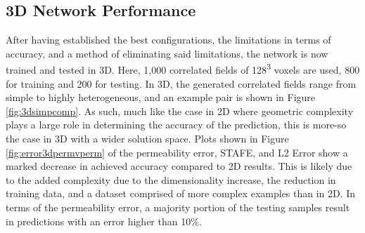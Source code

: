 \documentclass{article}
\begin{document}
\subsection{3D Network Performance}
\label{sec:3Dnetwork}
After having established the best configurations, the limitations in terms of accuracy, and a method of eliminating said limitations, the network is now trained and tested in 3D. Here, 1,000 correlated fields of 128\textsuperscript{3} voxels are used, 800 for training and 200 for testing. In 3D, the generated correlated fields range from simple to highly heterogeneous, and an example pair is shown in Figure \ref{fig:3dsimpcomp}. As such, much like the case in 2D where geometric complexity plays a large role in determining the accuracy of the prediction, this is more-so the case in 3D with a wider solution space. Plots shown in Figure \ref{fig:error3dpermvperm} of the permeability error, STAFE, and L2 Error show a marked decrease in achieved accuracy compared to 2D results. This is likely due to the added complexity due to the dimensionality increase, the reduction in training data, and a dataset comprised of more complex examples than in 2D. In terms of the permeability error, a majority portion of the testing samples result in predictions with an error higher than 10\%.  
\end{document}
